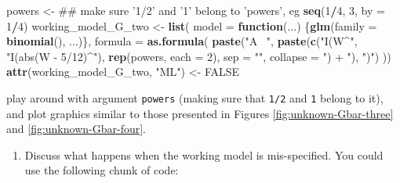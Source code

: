 \documentclass[]{article}
\newenvironment{Shaded}{\begin{snugshade}}{\end{snugshade}}
\newcommand{\ControlFlowTok}[1]{\textcolor[rgb]{0.13,0.29,0.53}{\textbf{#1}}}
\newcommand{\DataTypeTok}[1]{\textcolor[rgb]{0.13,0.29,0.53}{#1}}
\newcommand{\DecValTok}[1]{\textcolor[rgb]{0.00,0.00,0.81}{#1}}
\newcommand{\KeywordTok}[1]{\textcolor[rgb]{0.13,0.29,0.53}{\textbf{#1}}}
\newcommand{\NormalTok}[1]{#1}
\newcommand{\OperatorTok}[1]{\textcolor[rgb]{0.81,0.36,0.00}{\textbf{#1}}}
\newcommand{\OtherTok}[1]{\textcolor[rgb]{0.56,0.35,0.01}{#1}}
\newcommand{\StringTok}[1]{\textcolor[rgb]{0.31,0.60,0.02}{#1}}
\providecommand{\tightlist}{%
  \setlength{\itemsep}{0pt}\setlength{\parskip}{0pt}}
\theoremstyle{definition}
\theoremstyle{definition}
\theoremstyle{definition}
\theoremstyle{remark}
\begin{document}
\begin{Shaded}
\begin{Highlighting}[]
\NormalTok{powers <-}\StringTok{ }\NormalTok{## make sure '1/2' and '1' belong to 'powers', eg}
\StringTok{  }\KeywordTok{seq}\NormalTok{(}\DecValTok{1}\OperatorTok{/}\DecValTok{4}\NormalTok{, }\DecValTok{3}\NormalTok{, }\DataTypeTok{by =} \DecValTok{1}\OperatorTok{/}\DecValTok{4}\NormalTok{)}
\NormalTok{working_model_G_two <-}\StringTok{ }\KeywordTok{list}\NormalTok{(}
  \DataTypeTok{model =} \ControlFlowTok{function}\NormalTok{(...) \{}\KeywordTok{glm}\NormalTok{(}\DataTypeTok{family =} \KeywordTok{binomial}\NormalTok{(), ...)\},}
  \DataTypeTok{formula =} \KeywordTok{as.formula}\NormalTok{(}
    \KeywordTok{paste}\NormalTok{(}\StringTok{"A ~"}\NormalTok{,}
          \KeywordTok{paste}\NormalTok{(}\KeywordTok{c}\NormalTok{(}\StringTok{"I(W^"}\NormalTok{, }\StringTok{"I(abs(W - 5/12)^"}\NormalTok{),}
                \KeywordTok{rep}\NormalTok{(powers, }\DataTypeTok{each =} \DecValTok{2}\NormalTok{),}
                \DataTypeTok{sep =} \StringTok{""}\NormalTok{, }\DataTypeTok{collapse =} \StringTok{") + "}\NormalTok{),}
          \StringTok{")"}\NormalTok{)}
\NormalTok{  ))}
\KeywordTok{attr}\NormalTok{(working_model_G_two, }\StringTok{"ML"}\NormalTok{) <-}\StringTok{ }\OtherTok{FALSE}
\end{Highlighting}
\end{Shaded}

play around with argument \texttt{powers} (making sure that \texttt{1/2}
and \texttt{1} belong to it), and plot graphics similar to those
presented in Figures \ref{fig:unknown-Gbar-three} and
\ref{fig:unknown-Gbar-four}.

\begin{enumerate}
\def\labelenumi{\arabic{enumi}.}
\setcounter{enumi}{4}
\tightlist
\item
  Discuss what happens when the working model is mis-specified. You
  could use the following chunk of code:
\end{enumerate}
\end{document}
